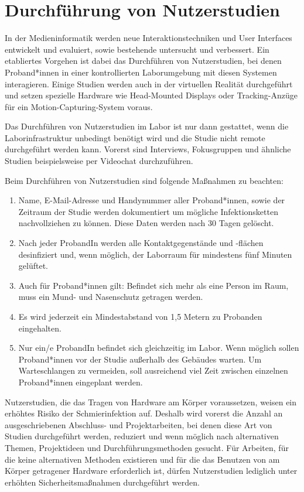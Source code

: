 \section{Durchführung von Nutzerstudien}\label{sec:nutzerstudien}

\noindent
In der Medieninformatik werden neue Interaktionstechniken und User Interfaces entwickelt und evaluiert, sowie bestehende untersucht und verbessert.
Ein etabliertes Vorgehen ist dabei das Durchführen von Nutzerstudien, bei denen Proband*innen in einer kontrollierten Laborumgebung mit diesen Systemen interagieren.
Einige Studien werden auch in der virtuellen Realität durchgeführt und setzen spezielle Hardware wie Head-Mounted Displays oder Tracking-Anzüge für ein Motion-Capturing-System voraus.

\medskip
\noindent
Das Durchführen von Nutzerstudien im Labor ist nur dann gestattet, wenn die Laborinfrastruktur unbedingt benötigt wird und die Studie nicht remote durchgeführt werden kann.
Vorerst sind Interviews, Fokusgruppen und ähnliche Studien beispielsweise per Videochat durchzuführen.

\noindent
Beim Durchführen von Nutzerstudien sind folgende Maßnahmen zu beachten:

\begin{enumerate}
    \item Name, E-Mail-Adresse und Handynummer aller Proband*innen, sowie der Zeitraum der Studie werden dokumentiert um mögliche Infektionsketten nachvollziehen zu können. Diese Daten werden nach 30 Tagen gelöscht.
    \item Nach jeder ProbandIn werden alle Kontaktgegenstände und -flächen desinfiziert und, wenn möglich, der Laborraum für mindestens fünf Minuten gelüftet.
    \item Auch für Proband*innen gilt: Befindet sich mehr als eine Person im Raum, muss ein Mund- und Nasenschutz getragen werden.
    \item Es wird jederzeit ein Mindestabstand von 1,5 Metern zu Probanden eingehalten.
    \item Nur ein/e ProbandIn befindet sich gleichzeitig im Labor. Wenn möglich sollen Proband*innen vor der Studie außerhalb des Gebäudes warten. Um Warteschlangen zu vermeiden, soll ausreichend viel Zeit zwischen einzelnen Proband*innen eingeplant werden.
\end{enumerate}

\noindent
Nutzerstudien, die das Tragen von Hardware am Körper voraussetzen, weisen ein erhöhtes Risiko der Schmierinfektion auf.
Deshalb wird vorerst die Anzahl an ausgeschriebenen Abschluss- und Projektarbeiten, bei denen diese Art von Studien durchgeführt werden, reduziert und wenn möglich nach alternativen Themen, Projektideen und Durchführungsmethoden gesucht.
Für Arbeiten, für die keine alternativen Methoden existieren und für die das Benutzen von am Körper getragener Hardware erforderlich ist, dürfen Nutzerstudien lediglich unter erhöhten Sicherheitsmaßnahmen durchgeführt werden.

